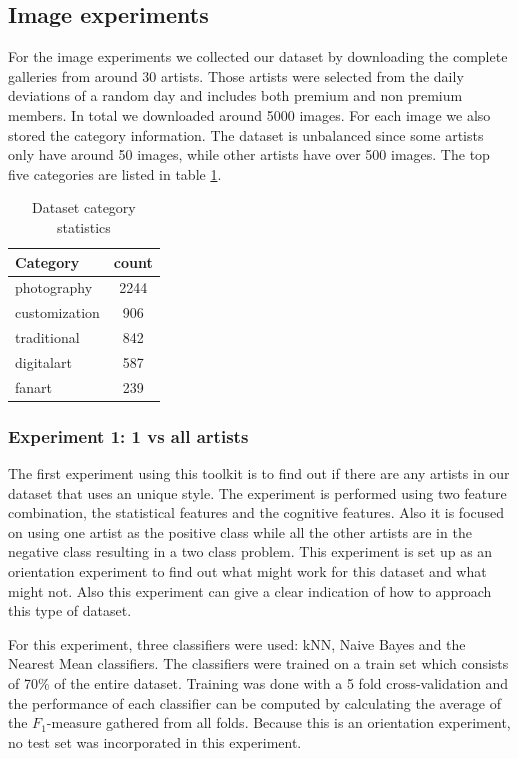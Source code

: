 \subsection{Image experiments}
For the image experiments we collected our dataset by downloading the complete galleries from around 30 artists.
Those artists were selected from the daily deviations of a random day and includes both premium and non premium members.
In total we downloaded around 5000 images. 
For each image we also stored the category information.
The dataset is unbalanced since some artists only have around 50 images, while other artists have over 500 images.
The top five categories are listed in table \ref{datasetstats}.

\begin{table}
    \centering
    \begin{tabular}
        { | l | c | } 
        \hline
        Category & count \\
        \hline
        photography & 2244 \\ 
        customization & 906 \\ 
        traditional & 842 \\ 
        digitalart & 587 \\ 
        fanart & 239 \\ 
        \hline 
    \end{tabular}
    \caption{Dataset category statistics}
    \label{datasetstats}
\end{table}

\subsubsection{Experiment 1: 1 vs all artists}
The first experiment using this toolkit is to find out if there are any artists in our dataset that uses an unique style.
The experiment is performed using two feature combination, the statistical features and the cognitive features.
Also it is focused on using one artist as the positive class while all the other artists are in the negative class resulting in a two class problem.
This experiment is set up as an orientation experiment to find out what might work for this dataset and what might not.
Also this experiment can give a clear indication of how to approach this type of dataset.

For this experiment, three classifiers were used: kNN, Naive Bayes and the Nearest Mean classifiers.
The classifiers were trained on a train set which consists of 70\% of the entire dataset.
Training was done with a 5 fold cross-validation and the performance of each classifier can be computed by calculating the average of the $F_1$-measure gathered from all folds.
Because this is an orientation experiment, no test set was incorporated in this experiment.

